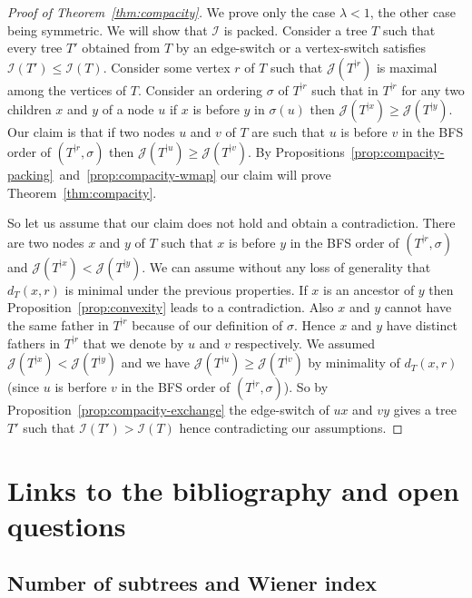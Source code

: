 \documentclass[11 pt]{modarticle}
\newcommand{\distance}[3]{d_{#3}(#1,#2)}
\newcommand{\rtree}[2]{{#1}^{\lvert #2}}
\newcommand{\ortree}[3]{(\rtree{#1}{#2},{#3})}
\newcommand{\indexsymbol}{\mathcal{I}}
\newcommand{\tindex}[1]{\indexsymbol(#1)}
\newcommand{\rindexsymbol}{\mathcal{J}}
\newcommand{\rindex}[2]{\rindexsymbol(\rtree{#2}{#1})}
\begin{document}
\begin{proof}[Proof of Theorem~\ref{thm:compacity}]
We prove only the case $\lambda < 1$, the other case being symmetric. We will show that $\indexsymbol$ is packed. Consider a tree $T$ such that every tree $T'$ obtained from $T$ by an edge-switch or a vertex-switch satisfies $\tindex{T'} \leq \tindex{T}$. Consider some vertex $r$ of $T$ such that $\rindex{r}{T}$ is maximal among the vertices of $T$. Consider an ordering $\sigma$ of $\rtree{T}{r}$ such that in $\rtree{T}{r}$ for any two children $x$ and $y$ of a node $u$ if $x$ is before $y$ in $\sigma(u)$ then $\rindex{x}{T} \geq \rindex{y}{T}$. Our claim is that if two nodes $u$ and $v$ of $T$ are such that $u$ is before $v$ in the BFS order of $\ortree{T}{r}{\sigma}$ then $\rindex{u}{T} \geq \rindex{v}{T}$. By Propositions~\ref{prop:compacity-packing}~and~\ref{prop:compacity-wmap} our claim will prove Theorem~\ref{thm:compacity}.

So let us assume that our claim does not hold and obtain a contradiction. There are two nodes $x$ and $y$ of $T$ such that $x$ is before $y$ in the BFS order of $\ortree{T}{r}{\sigma}$ and $\rindex{x}{T} < \rindex{y}{T}$. We can assume without any loss of generality that $\distance{x}{r}{T}$ is minimal under the previous properties. If $x$ is an ancestor of $y$ then Proposition~\ref{prop:convexity} leads to a contradiction. Also $x$ and $y$ cannot have the same father in $\rtree{T}{r}$ because of our definition of $\sigma$. Hence $x$ and $y$ have distinct fathers in $\rtree{T}{r}$ that we denote by $u$ and $v$ respectively. We assumed $\rindex{x}{T} < \rindex{y}{T}$ and we have $\rindex{u}{T} \geq \rindex{v}{T}$ by minimality of $\distance{x}{r}{T}$ (since $u$ is berfore $v$ in the BFS order of $\ortree{T}{r}{\sigma}$). So by Proposition~\ref{prop:compacity-exchange} the edge-switch of $ux$ and $vy$ gives a tree $T'$ such that $\tindex{T'} > \tindex{T}$ hence contradicting our assumptions.
\end{proof}

\section{Links to the bibliography and open questions}\label{section:links}

\subsection{Number of subtrees and Wiener index}
\end{document}
